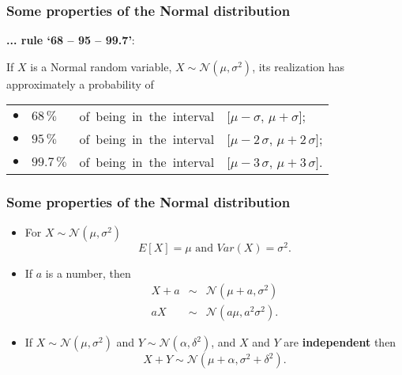 \documentclass[notes=show,smaller,handout]{beamer}\usepackage[]{graphicx}\usepackage[]{color}
\newcommand{\N}{\mathcal{N}}
\newenvironment{stepitemize}{\begin{itemize}[<+->]}{\end{itemize} }
\begin{document}
\begin{frame}%

\frametitle{Some properties of the Normal distribution}




\textbf{... rule `68 -- 95 -- 99.7'}: \\ \vspace{0.5cm}


If $X$ is a Normal random variable, $X \sim \N(\mu, \sigma^2)$, its realization has approximately a probability of \\ \vspace{0.5cm}

\begin{tabular}{llll}
$\bullet$
&
$68 \, \%$
&
\mbox{of being in the interval}
&
$\lbrack \mu - \sigma, \, \mu + \sigma \rbrack$;\\[0.2cm]
$\bullet$
&
$95 \, \%$
&
\mbox{of being in the interval}
&
$\lbrack \mu - 2 \, \sigma, \, \mu + 2 \, \sigma \rbrack$;\\[0.2cm]
$\bullet$
&
$99.7 \, \%$
&
\mbox{of being in the interval}&
$\lbrack \mu - 3 \, \sigma, \, \mu + 3 \, \sigma \rbrack$.\\[0.2cm]
\end{tabular}
\end{frame}


\begin{frame}%

\frametitle{Some properties of the Normal distribution}

\begin{stepitemize}
\item For $X\sim \N\left( \mu ,\sigma ^{2}\right) $
\begin{equation*}
E\left[ X\right] =\mu \text{ and }Var\left( X\right) =\sigma ^{2}.
\end{equation*}

\item If $a$ is a number, then
\begin{eqnarray*}
X+a &\sim &\N\left( \mu +a,\sigma ^{2}\right) \\
aX &\sim &\N\left( a\mu ,a^{2}\sigma ^{2}\right).
\end{eqnarray*}

\item If $X\sim \N\left( \mu ,\sigma ^{2}\right) $ and $Y\sim \N\left( \alpha
,\delta ^{2}\right) $, and $X$ and $Y$ are \textbf{independent} then%
\begin{equation*}
X+Y\sim \N\left( \mu +\alpha ,\sigma ^{2}+\delta ^{2}\right).
\end{equation*}

\end{stepitemize}

\end{frame}%
\end{document}
